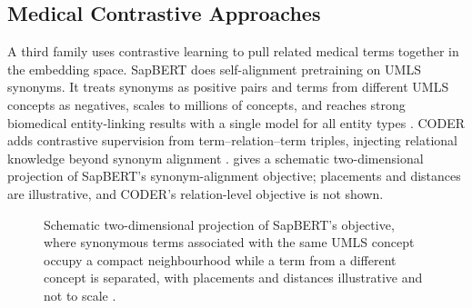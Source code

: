 \subsection{Medical Contrastive Approaches}

A third family uses contrastive learning to pull related medical terms together in the
embedding space. SapBERT does self-alignment pretraining on UMLS synonyms. It treats synonyms
as positive pairs and terms from different UMLS concepts as negatives, scales to millions of
concepts, and reaches strong biomedical entity-linking results with a single model for all entity types
\citep{liu2021sapbert}. CODER adds contrastive supervision from term--relation--term triples,
injecting relational knowledge beyond synonym alignment \citep{yuan2022coder}.
 gives a schematic two-dimensional projection of SapBERT's
synonym-alignment objective; placements and distances are illustrative, and CODER's relation-level
objective is not shown.

\begin{figure}[t]
\centering
{}
\caption{Schematic two-dimensional projection of SapBERT's objective, where synonymous terms
associated with the same UMLS concept occupy a compact neighbourhood while a term from a
different concept is separated, with placements and distances illustrative and not to scale
\citep{liu2021sapbert}.}
\label{fig:corpus-contrastive}
\end{figure}

